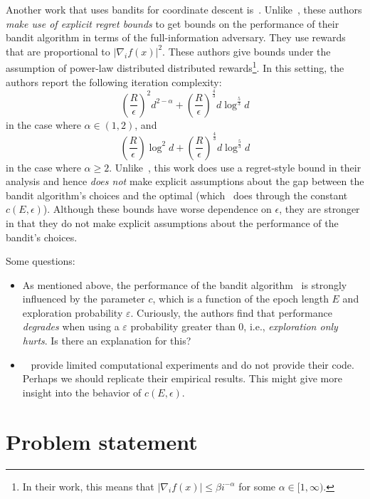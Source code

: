 \documentclass[letterpaper]{article}
\begin{document}
Another work that uses bandits for coordinate descent is~\cite{namkoong2017adaptive}. Unlike~\cite{salehi2018coordinate}, these authors \emph{make use of explicit regret bounds} to get bounds on the performance of their bandit algorithm in terms of the full-information adversary. They use rewards that are proportional to $|\nabla_i f(x)|^2$. These authors give bounds under the assumption of power-law distributed distributed rewards\footnote{In their work, this means that $|\nabla_i f(x)| \leq \beta i^{-\alpha}$ for some $\alpha \in [1, \infty)$.}. In this setting, the authors report the following iteration complexity:
\begin{equation}
    \left(\frac{R}{\epsilon}\right)^2 d^{2-\alpha} + \left(\frac{R}{\epsilon}\right)^\frac{4}{3} d \log^\frac{5}{3} d
\end{equation}
in the case where $\alpha \in (1,2)$, and
\begin{equation}
    \left(\frac{R}{\epsilon}\right) \log^2 d + \left(\frac{R}{\epsilon}\right)^\frac{4}{3} d \log^\frac{5}{3} d
\end{equation}
in the case where $\alpha \geq 2$. Unlike~\cite{salehi2018coordinate}, this work does use a regret-style bound in their analysis and hence \emph{does not} make explicit assumptions about the gap between the bandit algorithm's choices and the optimal (which~\cite{salehi2018coordinate} does through the constant $c(E, \epsilon)$). Although these bounds have worse dependence on $\epsilon$, they are stronger in that they do not make explicit assumptions about the performance of the bandit's choices.

Some questions:
\begin{itemize}
    \item As mentioned above, the performance of the bandit algorithm~\cite{salehi2018coordinate} is strongly influenced by the parameter $c$, which is a function of the epoch length $E$ and exploration probability $\varepsilon$. Curiously, the authors find that performance \emph{degrades} when using a $\varepsilon$ probability greater than 0, i.e., \emph{exploration only hurts}. Is there an explanation for this?
    \item ~\cite{salehi2018coordinate} provide limited computational experiments and do not provide their code. Perhaps we should replicate their empirical results. This might give more insight into the behavior of $c(E, \epsilon)$.
\end{itemize}


\section{Problem statement}
\end{document}
